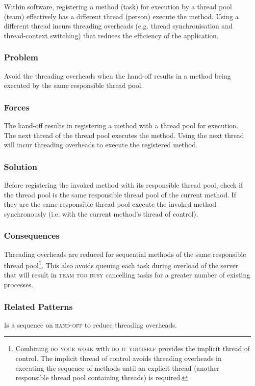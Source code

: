 \documentclass[prodmode]{style/acmlarge}
\begin{document}
Within software, registering a method (task) for execution by a thread pool
(team) effectively has a different thread (person) execute the method.  Using a
different thread incurs threading overheads (e.g. thread synchronisation and
thread-context switching) that reduces the efficiency of the application.

\subsubsection*{\textbf{Problem}} Avoid the threading overheads when the
hand-off results in a method being executed by the same responsible thread pool.

\subsubsection*{Forces} The hand-off results in registering a method with a
thread pool for execution.  The next thread of the thread pool executes the
method.  Using the next thread will incur threading overheads to execute the
registered method.

\subsubsection*{\textbf{Solution}} Before registering the invoked method with its
responsible thread pool, check if the thread pool is the same responsible thread
pool of the current method.  If they are the same responsible thread pool
execute the invoked method synchronously (i.e. with the current method's thread
of control).

\subsubsection*{Consequences} Threading overheads are reduced for sequential
methods of the same responsible thread pool\footnote{Combining \textsc{do your
work} with \textsc{do it yourself} provides the implicit thread of control.  The
implicit thread of control avoids threading overheads in executing the
sequence of methods until an explicit thread (another responsible thread pool
containing threads) is required.}.  This also avoids queuing each task during
overload of the server that will result in \textsc{team too busy} cancelling
tasks for a greater number of existing processes.

\subsubsection*{Related Patterns} Is a sequence on \textsc{hand-off} to reduce
threading overheads.
\end{document}
